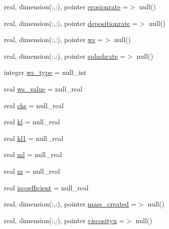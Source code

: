 \begin{DoxyCompactItemize}
\item 
real, dimension(\+:,\+:), pointer \mbox{\hyperlink{structmodulerunoffproperties_1_1t__property_aa361cec70e0213f004395ae6280edd09}{erosionrate}} =$>$ null()
\item 
real, dimension(\+:,\+:), pointer \mbox{\hyperlink{structmodulerunoffproperties_1_1t__property_af0f07ae67ba06bd0deef9d786bb51977}{depositionrate}} =$>$ null()
\item 
real, dimension(\+:,\+:), pointer \mbox{\hyperlink{structmodulerunoffproperties_1_1t__property_af3da4b68a668aee216d83c3a5ea4ca7f}{ws}} =$>$ null()
\item 
real, dimension(\+:,\+:), pointer \mbox{\hyperlink{structmodulerunoffproperties_1_1t__property_aed7f4838928d7336ca6f1515d9208319}{splashrate}} =$>$ null()
\item 
integer \mbox{\hyperlink{structmodulerunoffproperties_1_1t__property_a9c5d5f2b2c51aa1302bc8b2d7004cf6f}{ws\+\_\+type}} = null\+\_\+int
\item 
real \mbox{\hyperlink{structmodulerunoffproperties_1_1t__property_ac9a057648d2b3fd2224929dbcc72fb5d}{ws\+\_\+value}} = null\+\_\+real
\item 
real \mbox{\hyperlink{structmodulerunoffproperties_1_1t__property_a0c332f812d153f7189d04ba2fe5d2a9b}{chs}} = null\+\_\+real
\item 
real \mbox{\hyperlink{structmodulerunoffproperties_1_1t__property_adb910e413f0afe23579d6b0cc280c781}{kl}} = null\+\_\+real
\item 
real \mbox{\hyperlink{structmodulerunoffproperties_1_1t__property_aecaa610a543dadfaadafb9a519bfbb63}{kl1}} = null\+\_\+real
\item 
real \mbox{\hyperlink{structmodulerunoffproperties_1_1t__property_ac1c0f0eefc8535da4b06e6796a863e74}{ml}} = null\+\_\+real
\item 
real \mbox{\hyperlink{structmodulerunoffproperties_1_1t__property_a76fe7d951fe694ffec977b3716f2e364}{m}} = null\+\_\+real
\item 
real \mbox{\hyperlink{structmodulerunoffproperties_1_1t__property_a6000cbab23e6918278e9bff8b66579a6}{iscoefficient}} = null\+\_\+real
\item 
real, dimension(\+:,\+:), pointer \mbox{\hyperlink{structmodulerunoffproperties_1_1t__property_a2966fcb01c8f3bb3466b8e31014cfdf5}{mass\+\_\+created}} =$>$ null()
\item 
real, dimension(\+:,\+:), pointer \mbox{\hyperlink{structmodulerunoffproperties_1_1t__property_a3eaa57055ab93f919528a626926318f7}{viscosityu}} =$>$ null()

\end{DoxyCompactItemize}
